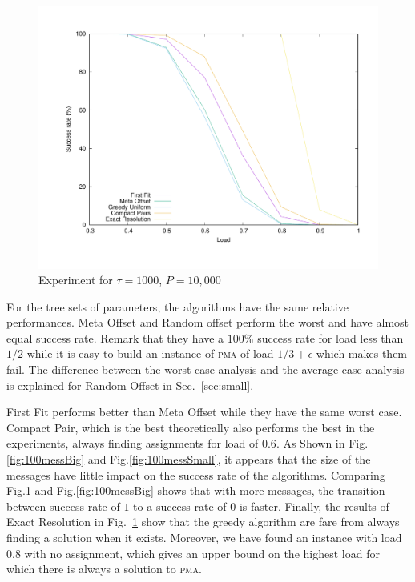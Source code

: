 \documentclass[10pt, conference, letterpaper]{IEEEtran}
\newcommand\pma{\textsc{pma}\xspace}
\begin{document}
\begin{figure}
\begin{center}
\includegraphics[scale=0.3]{10mess}
\end{center}
\caption{Experiment for $\tau = 1000$, $P=10,000$}
\label{fig:10mess}
\end{figure}

For the tree sets of parameters, the algorithms have the same relative performances. Meta Offset and Random offset
perform the worst and have almost equal success rate. Remark that they have a $100\%$ success rate for load
less than $1/2$ while it is easy to build an instance of \pma of load $1/3 +\epsilon$ which makes them fail. 
The difference between the worst case analysis and the average case analysis is explained for Random Offset in Sec.~\ref{sec:small}.

First Fit performs better than Meta Offset while they have the same worst case.  Compact Pair, which is the best theoretically also performs the best in the experiments, always finding assignments for load of 
$0.6$. As Shown in Fig.\ref{fig:100messBig} and Fig.\ref{fig:100messSmall}, it appears that the size of the messages have little impact on the success rate of the algorithms. Comparing Fig.\ref{fig:10mess} and Fig.\ref{fig:100messBig} shows that with more messages, the transition between success rate of $1$ to a success rate of $0$ is faster.
Finally, the results of Exact Resolution in Fig.~\ref{fig:10mess} show that the greedy algorithm are fare from always finding 
a solution when it exists. Moreover, we have found an instance with load $0.8$ with no assignment, which gives an upper bound on the highest load for which there is always a solution to \pma.
\end{document}
